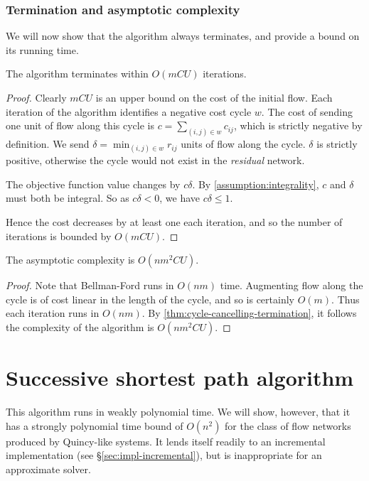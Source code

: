 \subsubsection{Termination and asymptotic complexity}

We will now show that the algorithm always terminates, and provide a bound on its running time.\\

\begin{thm} \label{thm:cycle-cancelling-termination}
The algorithm terminates within $O(mCU)$ iterations.
\end{thm}
\begin{proof}
Clearly $mCU$ is an upper bound on the cost of the initial flow. Each iteration of the algorithm identifies a negative cost cycle $w$. The cost of sending one unit of flow along this cycle is $c = \sum_{(i,j) \in w} c_{ij}$, which is strictly negative by definition. We send $\delta = \min_{(i,j) \in w} r_{ij}$ units of flow along the cycle. $\delta$ is strictly positive, otherwise the cycle would not exist in the \emph{residual} network. 

The objective function value changes by $c\delta$. By \cref{assumption:integrality}, $c$ and $\delta$ must both be integral. So as $c\delta < 0$, we have $c\delta \leq 1$.

Hence the cost decreases by at least one each iteration, and so the number of iterations is bounded by $O(mCU)$.
\end{proof}

\begin{cor} \label{corollary:cycle-cancelling-complexity}
The asymptotic complexity is $O(nm^2CU)$.
\end{cor}
\begin{proof}
Note that Bellman-Ford runs in $O(nm)$ time. Augmenting flow along the cycle is of cost linear in the length of the cycle, and so is certainly $O(m)$. Thus each iteration runs in $O(nm)$. By \cref{thm:cycle-cancelling-termination}, it follows the complexity of the algorithm is $O(nm^2CU)$.
\end{proof}

\section{Successive shortest path algorithm}

This algorithm runs in weakly polynomial time. We will show, however, that it has a strongly polynomial time bound of $O(n^2)$ for the class of flow networks produced by Quincy-like systems. It lends itself readily to an incremental implementation (see \S\ref{sec:impl-incremental}), but is inappropriate for an approximate solver.


